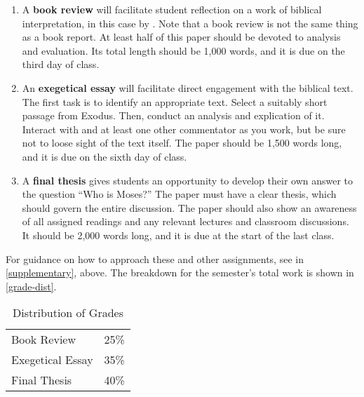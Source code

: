 \documentclass[titlepage]{article}
\newcommand\policy{../policy}
\begin{document}
\begin{enumerate}

	\item A \textbf{book review} will facilitate student reflection on a
	work of biblical interpretation, in this case by \cite{vonrad}. Note
	that a book review is not the same thing as a book report. At least
	half of this paper should be devoted to analysis and evaluation. Its
	total length should be 1,000 words, and it is due on the third day
	of class.

	\item An \textbf{exegetical essay} will facilitate direct engagement
	with the biblical text. The first task is to identify an appropriate
	text. Select a suitably short passage from Exodus. Then, conduct an
	analysis and explication of it. Interact with \cite{childs} and at
	least one other commentator as you work, but be sure not to loose
	sight of the text itself. The paper should be 1,500 words long, and
	it is due on the sixth day of class.

	\item A \textbf{final thesis} gives students an opportunity to
	develop their own answer to the question “Who is Moses?” The paper
	must have a clear thesis, which should govern the entire discussion.
	The paper should also show an awareness of all assigned readings and
	any relevant lectures and classroom discussions. It should be 2,000
	words long, and it is due at the start of the last class.


\end{enumerate}

For guidance on how to approach these and other assignments, see
\cite{rlgs} in \autoref{supplementary}, above. The breakdown for the
semester's total work is shown in \autoref{grade-dist}.

\begin{table}[htbp]
  \centering
  {\lining
  \begin{tabular}{lr}
    \toprule
    Book Review      & 25\% \\
    Exegetical Essay & 35\% \\
    Final Thesis     & 40\% \\
    \bottomrule
  \end{tabular}}
  \caption{Distribution of Grades}
  \label{grade-dist}
\end{table}




\end{document}
